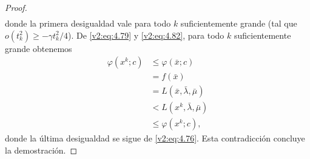 \begin{proof}
\begin{align}
    \end{align}
    donde la primera desigualdad vale para todo $k$ suficientemente grande (tal que $o(t_k^2) \ge -\gamma t_k^2 / 4$).
    De \eqref{v2:eq:4.79} y \eqref{v2:eq:4.82}, para todo $k$ suficientemente grande obtenemos
    \begin{align*}
        \varphi(x^k; c) &\le \varphi(\bar{x}; c) \\
        &= f(\bar{x}) \\
        &= L(\bar{x}, \bar{\lambda}, \bar{\mu}) \\
        &< L(x^k, \bar{\lambda}, \bar{\mu}) \\
        &\le \varphi(x^k; c),
    \end{align*}
    donde la última desigualdad se sigue de \eqref{v2:eq:4.76}. Esta contradicción concluye la demostración.
\end{proof}